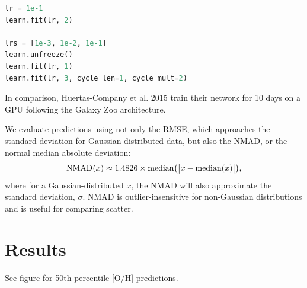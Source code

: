 \documentclass[fleqn,usenatbib]{mnras}
\begin{document}
\begin{lstlisting}[language=PYTHON]
lr = 1e-1
learn.fit(lr, 2)

lrs = [1e-3, 1e-2, 1e-1]
learn.unfreeze()
learn.fit(lr, 1)
learn.fit(lr, 3, cycle_len=1, cycle_mult=2)
\end{lstlisting}

In comparison, Huertas-Company et al. 2015 train their network for 10 days on a GPU following the Galaxy Zoo architecture.


We evaluate predictions using not only the RMSE, which approaches the standard deviation for Gaussian-distributed data, but also the NMAD, or the normal median absolute deviation:
\begin{equation}
{\rm NMAD}(x) \approx 1.4826 \times {\rm median} \big (\big|x - {\rm median }(x) \big|\big ),
\end{equation}
where for a Gaussian-distributed $x$, the NMAD will also approximate the standard deviation, $\sigma$.
NMAD is outlier-insensitive for non-Gaussian distributions and is useful for comparing scatter.

\section{Results}\label{sec:results}

See figure for 50th percentile [O/H] predictions.
\end{document}
